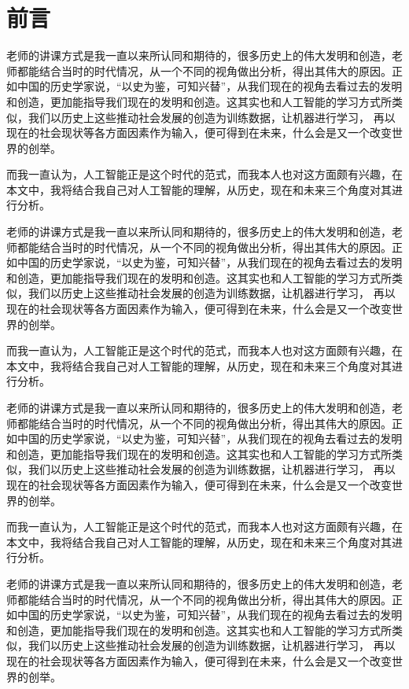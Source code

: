 \documentclass[UTF8]{XJTUthesis}
\begin{document}

\section{前言}
老师的讲课方式是我一直以来所认同和期待的，很多历史上的伟大发明和创造，老师都能结合当时的时代情况，从一个不同的视角做出分析，得出其伟大的原因。正如中国的历史学家说，“以史为鉴，可知兴替”，从我们现在的视角去看过去的发明和创造，更加能指导我们现在的发明和创造。这其实也和人工智能的学习方式所类似，我们以历史上这些推动社会发展的创造为训练数据，让机器进行学习， 再以现在的社会现状等各方面因素作为输入，便可得到在未来，什么会是又一个改变世界的创举。\par
而我一直认为，人工智能正是这个时代的范式，而我本人也对这方面颇有兴趣，在本文中，我将结合我自己对人工智能的理解，从历史，现在和未来三个角度对其进行分析。\par
老师的讲课方式是我一直以来所认同和期待的，很多历史上的伟大发明和创造，老师都能结合当时的时代情况，从一个不同的视角做出分析，得出其伟大的原因。正如中国的历史学家说，“以史为鉴，可知兴替”，从我们现在的视角去看过去的发明和创造，更加能指导我们现在的发明和创造。这其实也和人工智能的学习方式所类似，我们以历史上这些推动社会发展的创造为训练数据，让机器进行学习， 再以现在的社会现状等各方面因素作为输入，便可得到在未来，什么会是又一个改变世界的创举。\par
而我一直认为，人工智能正是这个时代的范式，而我本人也对这方面颇有兴趣，在本文中，我将结合我自己对人工智能的理解，从历史，现在和未来三个角度对其进行分析。\par
老师的讲课方式是我一直以来所认同和期待的，很多历史上的伟大发明和创造，老师都能结合当时的时代情况，从一个不同的视角做出分析，得出其伟大的原因。正如中国的历史学家说，“以史为鉴，可知兴替”，从我们现在的视角去看过去的发明和创造，更加能指导我们现在的发明和创造。这其实也和人工智能的学习方式所类似，我们以历史上这些推动社会发展的创造为训练数据，让机器进行学习， 再以现在的社会现状等各方面因素作为输入，便可得到在未来，什么会是又一个改变世界的创举。\par
而我一直认为，人工智能正是这个时代的范式，而我本人也对这方面颇有兴趣，在本文中，我将结合我自己对人工智能的理解，从历史，现在和未来三个角度对其进行分析。\par
老师的讲课方式是我一直以来所认同和期待的，很多历史上的伟大发明和创造，老师都能结合当时的时代情况，从一个不同的视角做出分析，得出其伟大的原因。正如中国的历史学家说，“以史为鉴，可知兴替”，从我们现在的视角去看过去的发明和创造，更加能指导我们现在的发明和创造。这其实也和人工智能的学习方式所类似，我们以历史上这些推动社会发展的创造为训练数据，让机器进行学习， 再以现在的社会现状等各方面因素作为输入，便可得到在未来，什么会是又一个改变世界的创举。\par
\end{document}
